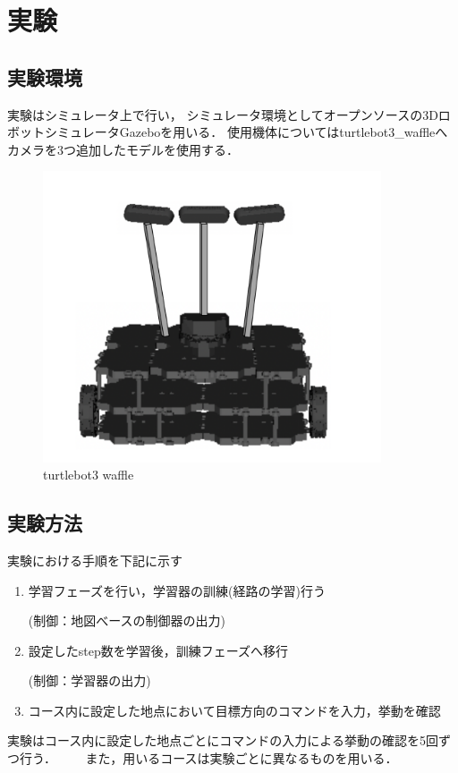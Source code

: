 \chapter{実験}
\section{実験環境}
実験はシミュレータ上で行い，
シミュレータ環境としてオープンソースの3DロボットシミュレータGazebo\cite{gazebo:online}を用いる．
使用機体についてはturtlebot3\_waffle\cite{turtlebot3:online}へカメラを3つ追加したモデルを使用する．

\begin{figure}[H]
    \centering
    \includegraphics[width = 10cm]{./figs/3_camera.png}
    \caption{turtlebot3 waffle}
    \label{fig::turtlebot3}
\end{figure}

\section{実験方法}

実験における手順を下記に示す
\begin{enumerate}
  \item 学習フェーズを行い，学習器の訓練(経路の学習)行う　
        
  (制御：地図べースの制御器の出力)
  \item 設定したstep数を学習後，訓練フェーズへ移行　
  
  (制御：学習器の出力)
  \item コース内に設定した地点において目標方向のコマンドを入力，挙動を確認
\end{enumerate}
実験はコース内に設定した地点ごとにコマンドの入力による挙動の確認を5回ずつ行う． 
　　また，用いるコースは実験ごとに異なるものを用いる．

